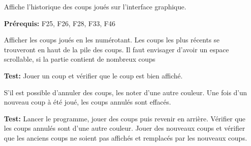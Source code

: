 \documentclass{article}
\begin{document}
\begin{needbox}
    Affiche l'historique des coups joués sur l'interface graphique.

    \textbf{Prérequis:} F25, F26, F28, F33, F46
    \begin{subneedbox}
        Afficher les coups joués en les numérotant. Les coups les plus récents se trouveront
        en haut de la pile des coups. Il faut envisager d'avoir un espace scrollable, si la partie
        contient de nombreux coups

        \textbf{Test:} Jouer un coup et vérifier que le coup est bien affiché.
    \end{subneedbox}
    \begin{subneedbox}
        S'il est possible d'annuler des coups, les noter d'une autre couleur. Une fois d'un
        nouveau coup à été joué, les coups annulés sont effacés.

        \textbf{Test:} Lancer le programme, jouer des coups puis revenir en arrière.
        Vérifier que les coups annulés sont d'une autre couleur. Jouer des nouveaux coups et vérifier que les anciens coups ne soient pas affichés et remplacés par les nouveaux coups.
    \end{subneedbox}
\end{needbox}
\end{document}
